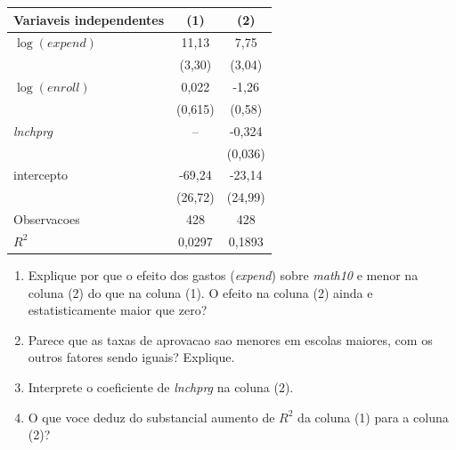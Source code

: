 \documentclass[12pt,letterpaper, onecolumn]{exam}
\begin{document}
\begin{questions}
\begin{center}
\begin{tabular}{lcc}
\toprule
Variaveis independentes & (1) & (2) \\
\midrule
\(\log(expend)\) & 11,13 & 7,75 \\
& (3,30) & (3,04) \\
\(\log(enroll)\) & 0,022 & -1,26 \\
& (0,615) & (0,58) \\
\textit{lnchprg} & -- & -0,324 \\
& & (0,036) \\
intercepto & -69,24 & -23,14 \\
& (26,72) & (24,99) \\
Observacoes & 428 & 428 \\
\(R^2\) & 0,0297 & 0,1893 \\
\bottomrule
\end{tabular}
\end{center}

\begin{enumerate}[label=(\roman*),resume]
    \item Explique por que o efeito dos gastos (\textit{expend}) sobre \textit{math10} e menor na coluna (2) do que na coluna (1). O efeito na coluna (2) ainda e estatisticamente maior que zero?
    \item Parece que as taxas de aprovacao sao menores em escolas maiores, com os outros fatores sendo iguais? Explique.
    \item Interprete o coeficiente de \textit{lnchprg} na coluna (2).
    \item O que voce deduz do substancial aumento de \(R^2\) da coluna (1) para a coluna (2)?
\end{enumerate}


\end{questions}
\end{document}
